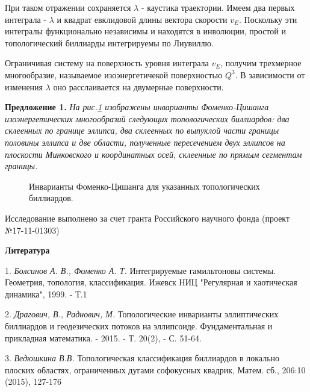 

При таком отражении сохраняется $\lambda$ - каустика траектории. Имеем два первых интеграла - $\lambda$ и квадрат евклидовой длины вектора скорости $v_E$. Поскольку эти интегралы функционально независимы и находятся в инволюции, простой и топологический биллиарды интегрируемы по Лиувиллю.

Ограничивая систему на поверхность уровня интеграла $v_E$, получим трехмерное многообразие, называемое изоэнергетичекой поверхностью $Q^3$. В зависимости от изменения $\lambda$ оно расслаивается на двумерные поверхности.


\textbf{Предложение 1.} {\it На рис.\ref{ex} изображены инварианты Фоменко-Цишанга изоэнергетических многообразий следующих топологических биллиардов: два склеенных по границе эллипса, два склеенных по выпуклой части границы половины эллипса и две области, полученные пересечением двух эллипсов на плоскости Минковского и координатных осей, склеенные по прямым сегментам границы.}

\begin{figure}[h!]
		\vspace*{-0.8 cm}
		\caption{Инварианты Фоменко-Цишанга для указанных топологических биллиардов.}\label{ex}
	\end{figure}

Исследование выполнено за счет гранта Российского научного фонда (проект №17-11-01303)

\smallskip \centerline{\bf Литература} \nopagebreak

1. {\it Болсинов А. В., Фоменко А. Т.} Интегрируемые гамильтоновы системы. Геометрия, топология, классификация.  Ижевск НИЦ "Регулярная и хаотическая динамика", 1999. - Т.1


2. {\it Драгович, В., Раднович, М.} Топологические инварианты эллиптических биллиардов и геодезических потоков на эллипсоиде. Фундаментальная и прикладная математика. - 2015. - Т. 20(2), -  С. 51-64.

3. {\it Ведюшкина В.В.} Топологическая классификация биллиардов в локально плоских областях,
ограниченных дугами софокусных квадрик, Матем. сб., 206:10 (2015), 127-176


